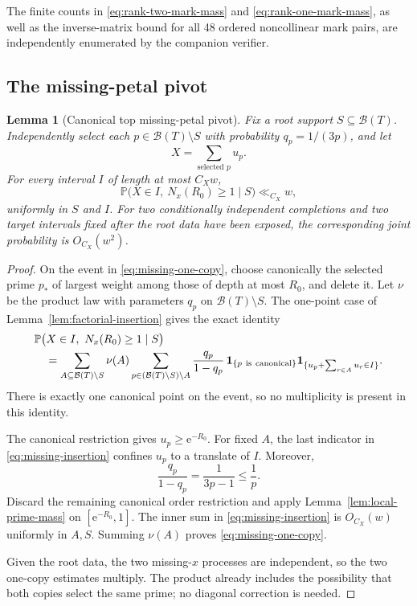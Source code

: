 \documentclass[11pt]{article}
\numberwithin{equation}{section}
\theoremstyle{plain}
\newtheorem{lemma}[theorem]{Lemma}
\newcommand{\Pp}{\mathbb P}
\newcommand{\1}{\mathbf 1}
\newcommand{\e}{\mathrm e}
\newcommand{\cB}{\mathcal B}
\begin{document}
The finite counts in \eqref{eq:rank-two-mark-mass} and
\eqref{eq:rank-one-mark-mass}, as well as the inverse-matrix bound for all
48 ordered noncollinear mark pairs, are independently enumerated by the
companion verifier.

\subsection{The missing-petal pivot}

\begin{lemma}[Canonical top missing-petal pivot]
\label{lem:missing-pivot}
Fix a root support $S\subseteq\cB(T)$.  Independently select each
$p\in\cB(T)\setminus S$ with probability $q_p=1/(3p)$, and let
\[
 X=\sum_{\text{selected }p}u_p.
\]
For every interval $I$ of length at most $C_Xw$,
\begin{equation}\label{eq:missing-one-copy}
 \Pp\bigl(X\in I,\ N_x(R_0)\ge1\mid S\bigr)
 \ll_{C_X}w,
\end{equation}
uniformly in $S$ and $I$.  For two conditionally independent completions
and two target intervals fixed after the root data have been exposed, the
corresponding joint probability is $O_{C_X}(w^2)$.
\end{lemma}

\begin{proof}
On the event in \eqref{eq:missing-one-copy}, choose canonically the selected
prime $p_*$ of largest weight among those of depth at most $R_0$, and delete
it.  Let $\nu$ be the product law with parameters $q_p$ on
$\cB(T)\setminus S$.  The one-point case of
Lemma~\ref{lem:factorial-insertion} gives the exact identity
\begin{align}
 &\Pp\bigl(X\in I,\ N_x(R_0)\ge1\mid S\bigr)\notag\\
 &\quad=
 \sum_{A\subseteq\cB(T)\setminus S}\nu(A)
 \sum_{p\in(\cB(T)\setminus S)\setminus A}
 \frac{q_p}{1-q_p}\,
 \1_{\{p\ \mathrm{is\ canonical}\}}
 \1_{\{u_p+\sum_{r\in A}u_r\in I\}}.                  \label{eq:missing-insertion}
\end{align}
There is exactly one canonical point on the event, so no multiplicity is
present in this identity.

The canonical restriction gives $u_p\ge\e^{-R_0}$.  For fixed $A$, the last
indicator in \eqref{eq:missing-insertion} confines $u_p$ to a translate of
$I$.  Moreover,
\begin{equation}\label{eq:missing-odds}
 \frac{q_p}{1-q_p}=\frac1{3p-1}\le\frac1p.
\end{equation}
Discard the remaining canonical order restriction and apply
Lemma~\ref{lem:local-prime-mass} on $[\e^{-R_0},1]$.  The inner sum in
\eqref{eq:missing-insertion} is $O_{C_X}(w)$ uniformly in $A,S$.
Summing $\nu(A)$ proves \eqref{eq:missing-one-copy}.

Given the root data, the two missing-$x$ processes are independent, so the
two one-copy estimates multiply.  The product already includes the
possibility that both copies select the same prime; no diagonal correction
is needed.
\end{proof}
\end{document}
